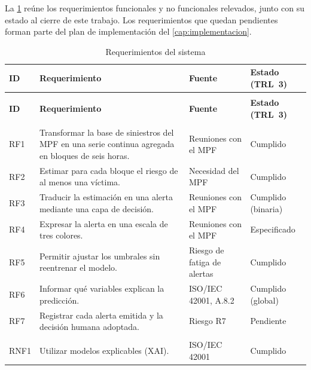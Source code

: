 La \cref{tab:requerimientos} reúne los requerimientos funcionales y no funcionales relevados, junto con su estado al cierre de este trabajo. Los requerimientos que quedan pendientes forman parte del plan de implementación del \cref{cap:implementacion}. %

{\small
\begin{longtable}{@{}>{\raggedright\arraybackslash}p{}
                    >{\raggedright\arraybackslash}p{}
                    >{\raggedright\arraybackslash}p{}
                    >{\raggedright\arraybackslash}p{}@{}}
\caption{Requerimientos del sistema}
\label{tab:requerimientos} \\
\toprule
\textbf{ID} & \textbf{Requerimiento} & \textbf{Fuente} & \textbf{Estado (TRL~3)} \\
\midrule
\endfirsthead
\multicolumn{4}{@{}l}{\footnotesize\textit{Tabla \ref{tab:requerimientos} (continuación)}} \\
\toprule
\textbf{ID} & \textbf{Requerimiento} & \textbf{Fuente} & \textbf{Estado (TRL~3)} \\
\midrule
\endhead
\bottomrule
\endfoot
\multicolumn{4}{@{}l}{\textit{Funcionales}} \\
RF1 & Transformar la base de siniestros del MPF en una serie continua agregada en bloques de seis horas. & Reuniones con el MPF & Cumplido \\
RF2 & Estimar para cada bloque el riesgo de al menos una víctima. & Necesidad del MPF & Cumplido \\
RF3 & Traducir la estimación en una alerta mediante una capa de decisión. & Reuniones con el MPF & Cumplido (binaria) \\
RF4 & Expresar la alerta en una escala de tres colores. & Reuniones con el MPF & Especificado \\
RF5 & Permitir ajustar los umbrales sin reentrenar el modelo. & Riesgo de fatiga de alertas & Cumplido \\
RF6 & Informar qué variables explican la predicción. & ISO/IEC 42001, A.8.2 & Cumplido (global) \\
RF7 & Registrar cada alerta emitida y la decisión humana adoptada. & Riesgo R7 & Pendiente \\
\midrule
\multicolumn{4}{@{}l}{\textit{No funcionales}} \\
RNF1 & Utilizar modelos explicables (XAI). & ISO/IEC 42001 & Cumplido \\

\end{longtable}}
